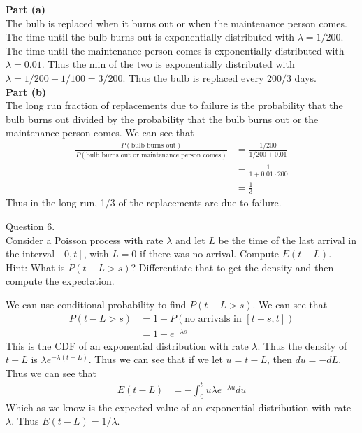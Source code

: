 \documentclass[answers,12pt,addpoints]{exam}
\begin{document}
\begin{questions}
\begin{solution}
    \textbf{Part (a)}\\
    The bulb is replaced when it burns out or when the maintenance person comes. The time until the bulb burns out is exponentially distributed with \( \lambda = 1/200 \). The time until the maintenance person comes is exponentially distributed with \( \lambda = 0.01 \). Thus the min of the two is exponentially distributed with \( \lambda = 1/200 + 1/100 = 3/200 \). Thus the bulb is replaced every \( 200/3 \) days.\\
    \textbf{Part (b)}\\
    The long run fraction of replacements due to failure is the probability that the bulb burns out divided by the probability that the bulb burns out or the maintenance person comes. We can see that
    \begin{align*}
        \frac{P(\text{bulb burns out})}{P(\text{bulb burns out or maintenance person comes})} &= \frac{1/200}{1/200 + 0.01}\\
        &= \frac{1}{1 + 0.01 \cdot 200}\\
        &= \frac{1}{3}
    \end{align*}
    Thus in the long run, 1/3 of the replacements are due to failure.
\end{solution}

\question Question 6.\\
Consider a Poisson process with rate \(\lambda\) and let \(L\) be the time of the last arrival in the interval \([0, t]\),
with \(L = 0\) if there was no arrival. Compute \(E(t - L)\).\\
Hint: What is \(P(t - L > s)\)? Differentiate that to get the density and then compute the
expectation.
\begin{solution}
    We can use conditional probability to find \(P(t - L > s)\). We can see that
    \begin{align*}
        P(t - L > s) &= 1 - P(\text{no arrivals in } [t-s, t])\\
        &= 1 - e^{-\lambda s}
    \end{align*}
    This is the CDF of an exponential distribution with rate \(\lambda\). Thus the density of \(t - L\) is \(\lambda e^{-\lambda(t-L)}\). Thus we can see that if we let \(u = t - L\), then \(du = -dL\). Thus we can see that
    \begin{align*}
        E(t - L) &= -\int_{0}^{t} u \lambda e^{-\lambda u} du
    \end{align*}
    Which as we know is the expected value of an exponential distribution with rate \(\lambda\). Thus \(E(t - L) = 1/\lambda\).    
\end{solution}


\end{questions}
\end{document}
